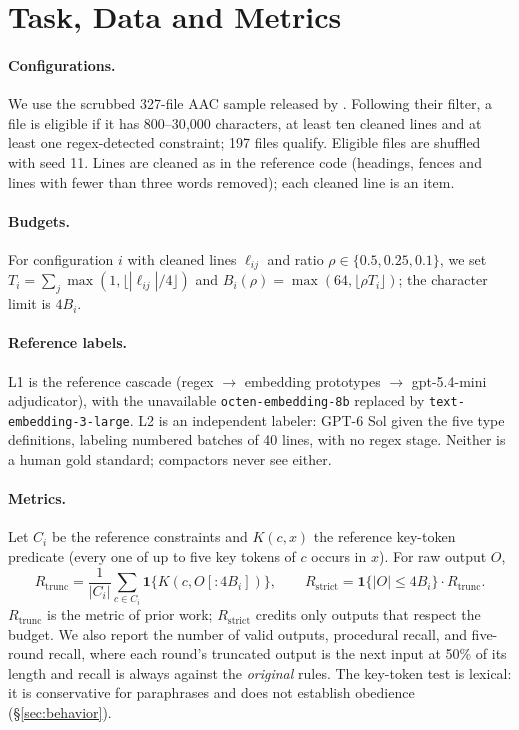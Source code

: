 \documentclass[11pt,a4paper]{article}
\newcommand{\Rt}{R_{\mathrm{trunc}}}
\newcommand{\Rs}{R_{\mathrm{strict}}}
\begin{document}
\section{Task, Data and Metrics}\label{sec:task}
\paragraph{Configurations.} We use the scrubbed 327-file AAC sample released by \citet{zerhoudi2026cliff}. Following their filter, a file is eligible if it has 800--30{,}000 characters, at least ten cleaned lines and at least one regex-detected constraint; 197 files qualify. Eligible files are shuffled with seed 11. Lines are cleaned as in the reference code (headings, fences and lines with fewer than three words removed); each cleaned line is an item.

\paragraph{Budgets.} For configuration $i$ with cleaned lines $\ell_{ij}$ and ratio $\rho\in\{0.5,0.25,0.1\}$, we set $T_i=\sum_j\max(1,\lfloor|\ell_{ij}|/4\rfloor)$ and $B_i(\rho)=\max(64,\lfloor\rho T_i\rfloor)$; the character limit is $4B_i$.

\paragraph{Reference labels.} L1 is the reference cascade (regex $\to$ embedding prototypes $\to$ gpt-5.4-mini adjudicator), with the unavailable \texttt{octen-embedding-8b} replaced by \texttt{text-embedding-3-large}. L2 is an independent labeler: GPT-6 Sol given the five type definitions, labeling numbered batches of 40 lines, with no regex stage. Neither is a human gold standard; compactors never see either.

\paragraph{Metrics.} Let $C_i$ be the reference constraints and $K(c,x)$ the reference key-token predicate (every one of up to five key tokens of $c$ occurs in $x$). For raw output $O$,
\begin{equation}
\Rt=\frac{1}{|C_i|}\sum_{c\in C_i}\mathbf{1}\{K(c,O[{:}4B_i])\},\qquad
\Rs=\mathbf{1}\{|O|\le 4B_i\}\cdot\Rt .
\end{equation}
$\Rt$ is the metric of prior work; $\Rs$ credits only outputs that respect the budget. We also report the number of valid outputs, procedural recall, and five-round recall, where each round's truncated output is the next input at 50\% of its length and recall is always against the \emph{original} rules. The key-token test is lexical: it is conservative for paraphrases and does not establish obedience (\S\ref{sec:behavior}).
\end{document}

